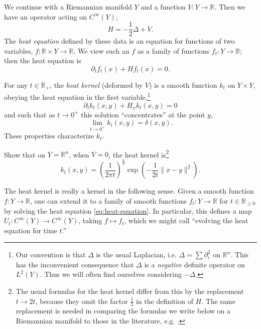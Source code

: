 \documentclass[12pt,letterpaper,reqno]{article}
\numberwithin{equation}{section}
\newcommand{\R}{\ensuremath{\mathbb R}}
\newcommand{\half}{\ensuremath{\frac{1}{2}}}
\newcommand{\norm}[1]{\lVert#1\rVert}
\newcommand{\ti}[1]{\textit{#1}}
\newcommand{\fixme}[1]{{\color{orange}{[#1]}}}
\begin{document}
We continue with a Riemannian manifold $Y$ and a function $V: Y \to \R$.
Then we have an operator acting on $C^\infty(Y)$,
\begin{equation}
  H = - \half \Delta + V.
\end{equation}
The \ti{heat equation} defined by these data is an equation
for functions of two variables, $f: \R \times Y \to \R$.
We view such an $f$ as a family of functions $f_t: Y \to \R$;
then the heat equation is
\begin{equation} \label{eq:heat-equation}
  \partial_t f_t(x) + H f_t(x) = 0. 
\end{equation}

\begin{prop} \fixme{what class of $Y$, $V$?}
For any $t \in \R_+$, the \ti{heat kernel} (deformed by $V$) 
is a smooth function $k_t$ on $Y \times Y$, obeying the heat
equation in the first variable,\footnote{Our
convention is that $\Delta$ is the usual Laplacian,
i.e. $\Delta = \sum \partial_i^2$ on $\R^n$. This has the inconvenient
consequence that $\Delta$ is a \ti{negative} definite operator on $L^2(Y)$.
Thus we will often find ourselves considering $- \Delta$.}
\begin{equation}
  \partial_t k_t(x,y) + H_x k_t(x,y) = 0
\end{equation}
and such that as $t \to 0^+$ this solution ``concentrates'' at the point $y$,
\begin{equation}
  \lim_{t \to 0^+} k_t(x,y) = \delta(x,y). 
\end{equation}
These properties characterize $k_t$.
\end{prop}
\begin{exercise}
Show that on $Y = \R^n$, when $V = 0$, the heat kernel
is\footnote{The usual formulas for the heat kernel differ from this by the
replacement $t \to 2t$, because they omit the factor $\half$ in the
definition of $H$. The same replacement is needed in comparing the formulas we write below
on a Riemannian manifold to those in the literature, e.g. \cite{Roe1988a}.}
\begin{equation}\label{eq:heat-kernel}
  k_t(x,y) = \left( \frac{1}{2 \pi t} \right)^{\frac{n}{2}} \exp \left( - \frac{1}{2t} \norm{x-y}^2 \right).
\end{equation}
\end{exercise}

The heat kernel is really a kernel in the following sense.
Given a smooth function $f: Y \to \R$, one can extend it to a family of smooth 
functions $f_t: Y \to \R$ for $t \in \R_{\ge 0}$ by solving the heat equation
\eqref{eq:heat-equation}.
In particular, this defines a map $U_t: C^\infty(Y) \to C^\infty(Y)$,
taking $f \mapsto f_t$, which we might call
``evolving the heat equation for time $t$.''
\end{document}

